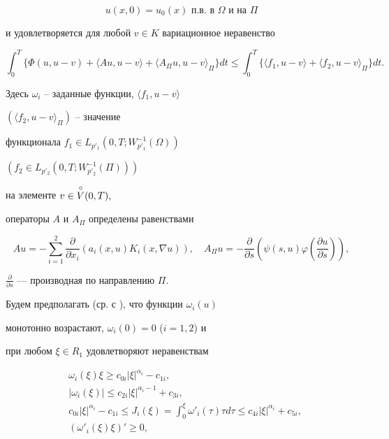 \begin{equation} 


u(x,0)=u_0(x)\text { п.в. в }\Omega\text{ и на }\Pi 


\end{equation} 


и удовлетворяется для любой $v\in K$ вариационное неравенство 


\begin{equation} 


\int^T_0\{\Phi(u,u-v)+\langle Au,u-v\rangle +\langle A_{\Pi}u, 


u-v\rangle_{\Pi}\}dt \le 


\int^T_0\{\langle f_1, u-v\rangle +\langle f_2, u-v\rangle _{\Pi}\}dt. 


\end{equation} 


Здесь $\omega_i$ -- заданные функции, $\langle f_1, u-v\rangle$ 


$(\langle f_2, u-v\rangle _{\Pi})$ -- значение 


функционала $f_1\in L_{p'_1}(0,T;W^{-1}_{p'_1}(\Omega))$ 


$(f_2\in L_{p'_2}(0,T;W^{-1}_{p'_2}(\Pi)))$ 


на элементе $v\in \overset{\circ} V(0,T),$ 


операторы $A$ и $A_{\Pi}$ определены равенствами 


$$ 


Au = -\sum^2_{i=1}\frac{\partial}{\partial x_i}(a_i(x,u) 


K_i(x,\nabla u)), \quad A_{\Pi}u = - \frac{\partial}{\partial s} 


\left(\psi (s,u)\varphi(\frac{\partial u}{\partial s})\right), 


$$ 


$\frac{\partial}{\partial s}$ --- производная по направлению $\Pi$. 


 


Будем предполагать (ср. с \cite{GP1}), что функции $\omega_i(u)$ 


монотонно возрастают, $\omega_i(0)=0$ ($i=1,2$) и 


при любом $\xi\in R_1$ удовлетворяют неравенствам 


\begin{align} 


&\omega_i(\xi)\xi\ge c_{0i}|\xi|^{\alpha_i}-c_{1i},\\ 


&|\omega_i(\xi)| \le c_{2i}|\xi|^{\alpha_i-1}+c_{3i},\\ 


&c_{0i}|\xi|^{\alpha_i}-c_{1i} \le J_i(\xi) = 


\int^{\xi}_0\omega '_i(\tau)\tau d\tau \le 


c_{4i}|\xi|^{\alpha_i}+c_{5i},\\ 


&(\omega '_i(\xi)\xi)' \ge 0, 


\end{align} 


